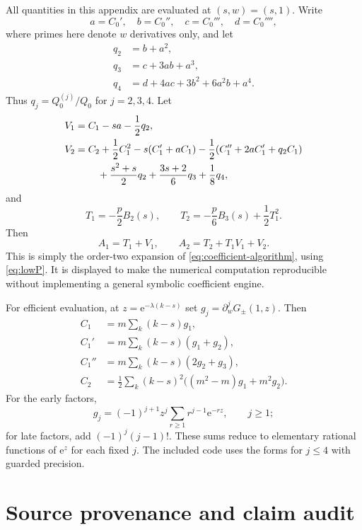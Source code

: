 \documentclass[11pt,a4paper]{article}
\numberwithin{equation}{section}
\theoremstyle{definition}
\newcommand{\ee}{\mathrm e}
\begin{document}
All quantities in this appendix are evaluated at $(s,w)=(s,1)$. Write
\[
 a=C_0',\quad b=C_0'',\quad c=C_0''',\quad d=C_0'''',
\]
where primes here denote $w$ derivatives only, and let
\begin{align*}
 q_2&=b+a^2,\\
 q_3&=c+3ab+a^3,\\
 q_4&=d+4ac+3b^2+6a^2b+a^4.
\end{align*}
Thus $q_j=Q_0^{(j)}/Q_0$ for $j=2,3,4$. Let
\begin{align}
 V_1&=C_1-sa-\frac12q_2,\nonumber\\
 V_2&=C_2+\frac12C_1^2-s(C_1'+aC_1)
 -\frac12(C_1''+2aC_1'+q_2C_1)\nonumber\\
 &\hspace{0.8cm}+\frac{s^2+s}{2}q_2+\frac{3s+2}{6}q_3+\frac18q_4,
 \label{eq:V2}
\end{align}
and
\[
 T_1=-\frac p2B_2(s),\qquad
 T_2=-\frac p6B_3(s)+\frac12T_1^2.
\]
Then
\begin{equation}
 A_1=T_1+V_1,\qquad A_2=T_2+T_1V_1+V_2.
 \label{eq:A2}
\end{equation}
This is simply the order-two expansion of \eqref{eq:coefficient-algorithm}, using \eqref{eq:lowP}. It is displayed to make the numerical computation reproducible without implementing a general symbolic coefficient engine.

For efficient evaluation, at $z=\ee^{-\lambda(k-s)}$ set
$g_j=\partial_w^jG_\pm(1,z)$. Then
\begin{align*}
 C_1&=m\sum_k(k-s)g_1,\\
 C_1'&=m\sum_k(k-s)(g_1+g_2),\\
 C_1''&=m\sum_k(k-s)(2g_2+g_3),\\
 C_2&=\frac12\sum_k(k-s)^2\bigl((m^2-m)g_1+m^2g_2\bigr).
\end{align*}
For the early factors,
\[
 g_j=(-1)^{j+1}z^j\sum_{r\geq1}r^{j-1}\ee^{-rz},\qquad j\geq1;
\]
for late factors, add $(-1)^j(j-1)!$. These sums reduce to elementary rational functions of $\ee^z$ for each fixed $j$. The included code uses the forms for $j\leq4$ with guarded precision.

\section{Source provenance and claim audit}
\label{app:provenance}
\end{document}
